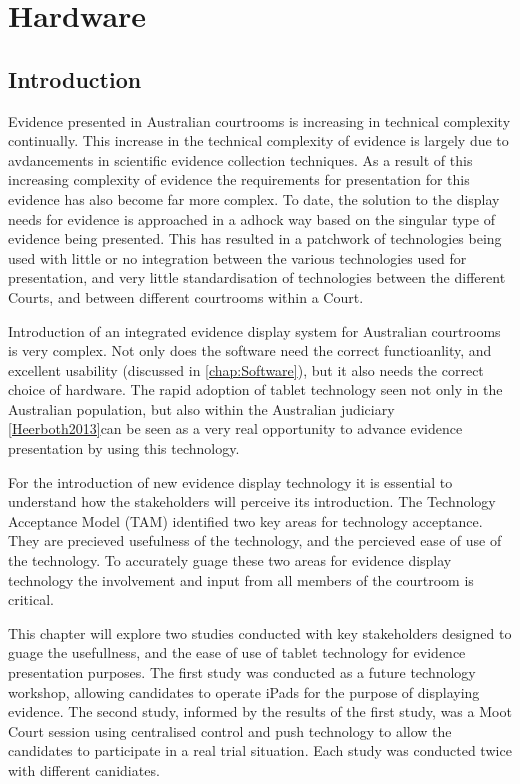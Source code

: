 \chapter{Hardware\label{chap:Hardware}}

\section{Introduction\label{Section:Hardware:Introduction}}

Evidence presented in Australian courtrooms is increasing in technical complexity continually. This increase in the technical complexity of evidence is largely due to avdancements in scientific evidence collection techniques. As a result of this increasing complexity of evidence the requirements for presentation for this evidence has also become far more complex. To date, the solution to the display needs for evidence is approached in a adhock way based on the singular type of evidence being presented. This has resulted in a patchwork of technologies being used with little or no integration between the various technologies used for presentation, and very little standardisation of technologies between the different Courts, and between different courtrooms within a Court. 

Introduction of an integrated evidence display system for Australian courtrooms is very complex. Not only does the software need the correct functioanlity, and excellent usability (discussed in  \ref{chap:Software}), but it also needs the correct choice of hardware. The rapid adoption of tablet technology seen not only in the Australian population, but also within the Australian judiciary \ref{Heerboth2013}can be seen as a very real opportunity to advance evidence presentation by using this technology.

For the introduction of new evidence display technology it is essential to understand how the stakeholders will perceive its introduction. The Technology Acceptance Model (TAM) identified two key areas for technology acceptance. They are precieved usefulness of the technology, and the percieved ease of use of the technology. To accurately guage these two areas for evidence display technology the involvement and input from all members of the courtroom is critical. 

This chapter will explore two studies conducted with key stakeholders designed to guage the usefullness, and the ease of use of tablet technology for evidence presentation purposes. The first study was conducted as a future technology workshop, allowing candidates to operate iPads for the purpose of displaying evidence. The second study, informed by the results of the first study, was a Moot Court session using centralised control and push technology to allow the candidates to participate in a real trial situation. Each study was conducted twice with different canidiates.

